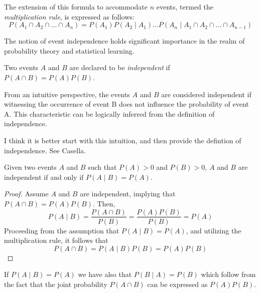 The extension of this formula to accommodate $n$ events, termed the \emph{multiplication rule}, is expressed as follows:
\begin{equation}\label{eq:multiplication_rule}
P \left( A_{1} \cap A_{2} \cap \ldots \cap A_{n} \right) = P \left( A_{1} \right) P \left( A_{2} \mid A_{1}\right) \ldots  P \left( A_{n} \mid A_{1}\cap A_{2} \cap \ldots \cap A_{n-1} \right)
\end{equation}

The notion of event independence holds significant importance in the realm of probability theory and statistical learning. 

\begin{definition}\label{independent_events}
Two events $A$ and $B$ are declared to be \emph{independent} if $P \left( A \cap B \right) = P \left( A \right) P \left(B \right)$.
\end{definition}

From an intuitive perspective, the events $A$ and $B$ are considered independent if witnessing the occurrence of event B does not influence the probability of event A. This characteristic can be logically inferred from the definition of independence.

{\color{red} I think it is better start with this intuition, and then provide the defintion of independence. See Casella.}

\begin{proposition}
Given two events $A$ and $B$ such that $P \left( A \right) > 0$ and $P \left( B \right)>0$, $A$ and $B$ are independent if and only if $P \left( A \mid B\right) = P \left( A \right)$.
\end{proposition}
\begin{proof}
Assume $A$ and $B$ are independent, implying that $P \left( A \cap B \right) = P \left( A \right) P \left(B \right)$. Then,
\[
P \left( A \mid B \right) = \frac{P\left(A\cap B\right)}{P\left(B\right)} = \frac{P \left( A \right) P \left(B \right)}{P\left(B\right)} = P \left( A \right)
\]
Proceeding from the assumption that $P \left( A \mid B \right) = P \left( A \right)$, and utilizing the multiplication rule, it follows that
\[
P \left( A \cap B \right) =  P \left( A \mid B \right) P \left( B \right) = P \left( A \right) P \left( B \right)
\]
\end{proof}

If $P \left( A \mid B\right) = P \left( A \right)$ we have also that $P \left( B \mid  A \right) = P \left( B \right)$ which follow from the fact that the joint probability $P \left( A \cap B \right)$ can be expressed as $P \left( A \right) P \left(B \right)$.

